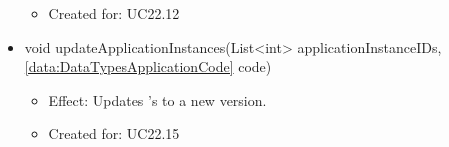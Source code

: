 \begin{description}
\begin{itemize}[noitemsep,nolistsep,leftmargin=-.25cm]
\begin{itemize}[noitemsep,nolistsep]
\item Created for: UC22.12
        \end{itemize}
      \item \textsf{void updateApplicationInstances(List\textless{}int\textgreater{} applicationInstanceIDs, \ref{data:DataTypesApplicationCode} code)}
        \begin{itemize}[noitemsep,nolistsep]
           \item Effect: Updates 's to a new version.
\item Created for: UC22.15
        \end{itemize}
    \end{itemize}
    \end{description}

